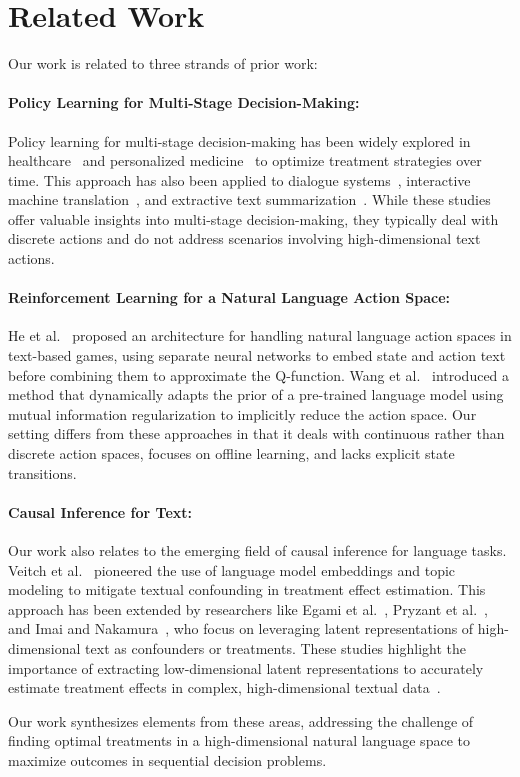 \section{Related Work}
Our work is related to three strands of prior work:

\paragraph{Policy Learning for Multi-Stage Decision-Making: } 
Policy learning for multi-stage decision-making has been widely explored in healthcare~\cite{moodie2012q,lei2012smart} and personalized medicine~\cite{cain2010start,wahed2004optimal} to optimize treatment strategies over time. This approach has also been applied to dialogue systems~\cite{peng2017composite,zhang2019budgeted}, interactive machine translation~\cite{lam2019interactive,huang2021transmart}, and extractive text summarization~\cite{dong2018banditsum,gu2021memsum}. While these studies offer valuable insights into multi-stage decision-making, they typically deal with discrete actions and do not address scenarios involving high-dimensional text actions.

\paragraph{Reinforcement Learning for a Natural Language Action Space: }
He et al.~\cite{he2015deep} proposed an architecture for handling natural language action spaces in text-based games, using separate neural networks to embed state and action text before combining them to approximate the Q-function. Wang et al.~\cite{wang2024language} introduced a method that dynamically adapts the prior of a pre-trained language model using mutual information regularization to implicitly reduce the action space. Our setting differs from these approaches in that it deals with continuous rather than discrete action spaces, focuses on offline learning, and lacks explicit state transitions.

\paragraph{Causal Inference for Text: } 
Our work also relates to the emerging field of causal inference for language tasks. Veitch et al.~\cite{veitch2020adapting} pioneered the use of language model embeddings and topic modeling to mitigate textual confounding in treatment effect estimation. This approach has been extended by researchers like Egami et al.~\cite{egami2022make}, Pryzant et al.~\cite{pryzant2020causal}, and Imai and Nakamura~\cite{imai2024causal}, who focus on leveraging latent representations of high-dimensional text as confounders or treatments. These studies highlight the importance of extracting low-dimensional latent representations to accurately estimate treatment effects in complex, high-dimensional textual data~\cite{louizos2017causal,kim2021counterfactual,zhang2024causal,wang2021desiderata}.

Our work synthesizes elements from these areas, addressing the challenge of finding optimal treatments in a high-dimensional natural language space to maximize outcomes in sequential decision problems.